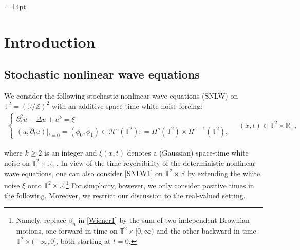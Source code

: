 \documentclass[letterpaper, 11pt,  reqno]{amsart}
\newcommand{\1}{\hspace{0.5mm}\text{I}\hspace{0.5mm}}
\newcommand{\noi}{\noindent}
\newcommand{\Z}{\mathbb{Z}}
\newcommand{\R}{\mathbb{R}}
\newcommand{\T}{\mathbb{T}}
\newcommand{\be}{\beta}
\newcommand{\Dl}{\Delta}
\newcommand{\dt}{\partial_t}
\renewcommand{\H}{\mathcal{H}}
\numberwithin{equation}{section}
\numberwithin{theorem}{section}
\newcommand{\hiro}[1]{\marginpar{\color{red} $\Leftarrow\Leftarrow\Leftarrow$}{\smallskip \noi\color{blue}HIRO: #1}\smallskip}
\begin{document}
\date{\today}
%
\maketitle
%


\baselineskip = 14pt




%



\section{Introduction}



\subsection{Stochastic nonlinear wave equations}


We consider 
the following stochastic nonlinear wave equations (SNLW)  on $\T^2 = (\R/\Z)^2$
with an additive space-time white noise forcing:
\begin{align}
\begin{cases}
\dt^2 u -  \Dl  u   \pm  u^k = \xi\\
(u, \dt u) |_{t = 0} = (\phi_0, \phi_1) \in \H^s(\T^2) : = H^s(\T^2)\times H^{s-1}(\T^2), 
\end{cases}
\quad (x, t) \in \T^2\times \R_+,
\label{SNLW1}
\end{align}


\noi
where $k\geq 2$ is an integer and 
$\xi(x, t)$ denotes a (Gaussian) space-time white noise on $\T^2\times \R_+$.
In view of the time reversibility of the deterministic nonlinear wave equations, 
one can also consider \eqref{SNLW1} on $\T^2 \times \R$
by extending 
the white noise $\xi$ onto $\T^2 \times \R$.\footnote{Namely, 
replace
$\be_n$ in \eqref{Wiener1} by the sum of  two independent Brownian motions, one forward in time on $\T^2\times [0, \infty)$ and 
the other backward in time $\T^2 \times (-\infty, 0]$,
both starting at $t = 0$.}
For simplicity, however, we only consider positive times in the following.
Moreover, we restrict our discussion to the real-valued setting.
\end{document}
